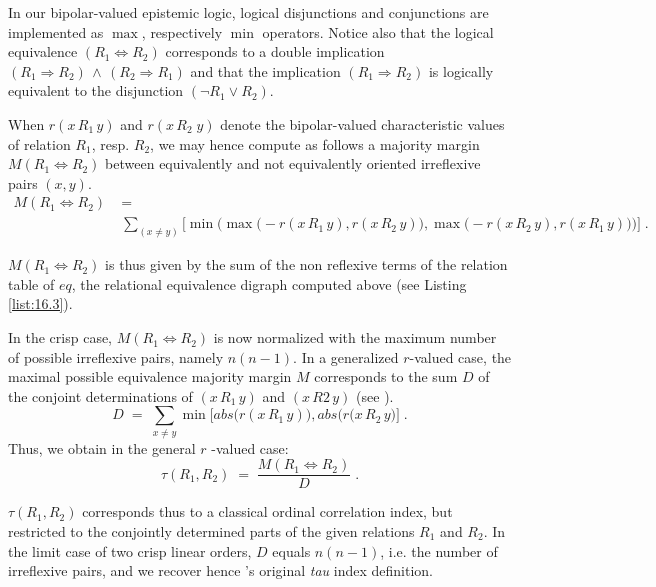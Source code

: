 In our bipolar-valued epistemic logic, logical disjunctions and conjunctions are implemented as $\max$, respectively $\min$ operators. Notice also that the logical equivalence $(R_1 \Leftrightarrow R_2)$ corresponds to a double implication $(R_1 \Rightarrow R_2)\, \wedge \, (R_2 \Rightarrow  R_1)$ and that the implication $(R_1 \Rightarrow R_2)$ is logically equivalent to the disjunction $(\neg R_1 \vee R_2)$.

When $r(x\,R_1\, y)$ and $r(x\,R_2\; y)$ denote the bipolar-valued characteristic values of relation $R_1$, resp. $R_2$, we may hence compute as follows a majority margin $M(R_1 \Leftrightarrow R_2)$ between equivalently and not equivalently oriented irreflexive pairs $(x,y)$.
\begin{equation}\label{eq:16:2}
\left.\begin{aligned}
M(R_1 \Leftrightarrow R_2) \; &= \\  &\sum_{(x \neq y)} \Big[ \min \Big( \max \big( -r(x \,R_1\, y), r(x \,R_2\, y)\big), \max \big( -r(x \,R_2\, y), r(x \,R_1\, y)\big) \Big) \Big]\;.
\end{aligned}\right.
\end{equation}

$M(R_1 \Leftrightarrow R_2)$ is thus given by the sum of the non reflexive terms of the relation table of $eq$, the relational equivalence digraph computed above (see Listing \ref{list:16.3}).

In the crisp case, $M(R_1 \Leftrightarrow R_2)$  is now normalized with the maximum number of possible irreflexive pairs, namely $n(n-1)$. In a generalized $r$-valued case, the maximal possible equivalence majority margin $M$ corresponds to the sum $D$ of the conjoint determinations of $(x \,R_1\, y)$ and $(x \,R2\, y)$ (see \citep{BIS-2012a}). 
\begin{equation}
  D \;=\; \sum_{x \neq y} \min \Big[ abs\big(r(x \,R_1\, y) \big), abs \big( r(x \,R_2\, y \big)  \Big]\;.
\end{equation}
Thus, we obtain in the general $r$ -valued case:
\begin{equation}
  \tau(R_1,R_2) \;=\; \frac{M(R_1 \Leftrightarrow R_2)}{D}\;.
\end{equation}

$\tau(R_1,R_2)$ corresponds thus to a classical ordinal correlation index, but restricted to the conjointly determined parts of the given relations $R_1$ and $R_2$. In the limit case of two crisp linear orders, $D$ equals $n(n-1)$, i.e. the number of irreflexive pairs, and we recover hence \Kendall 's original \emph{tau} index definition.

